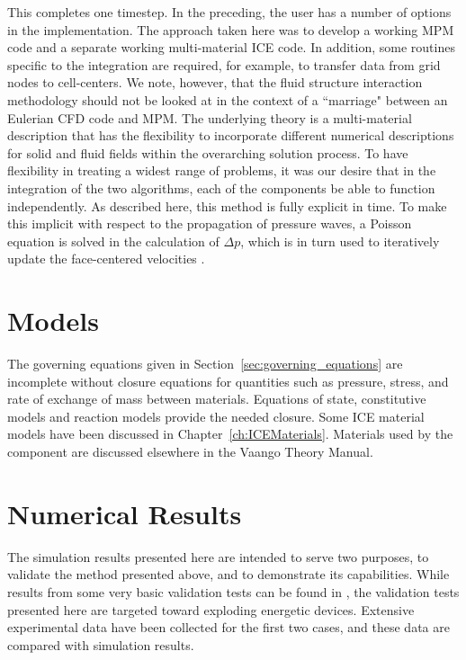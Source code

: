 This completes one timestep.  In the preceding, the user has a number of
options in the implementation.  The approach taken here was to develop a 
working MPM code and a separate working multi-material ICE code.  In 
addition, some routines specific to the integration are required, for 
example, to transfer data from grid nodes to cell-centers.  We 
note, however, that the fluid structure interaction methodology should 
not be looked at in the context of a ``marriage" between an Eulerian CFD 
code and MPM.  The underlying theory is a multi-material description
that has the flexibility to incorporate different numerical descriptions for 
solid and fluid fields within the overarching solution process. 
To have flexibility in treating a widest range of problems, it was our 
desire that in the integration of the two algorithms, each of the components 
be able to function independently.  As described here, this method is fully 
explicit in time.  To make this implicit with respect to the propagation 
of pressure waves, a Poisson equation is solved in the calculation of 
$\Delta p$, which is in turn used to iteratively update the face-centered 
velocities \cite{Kashiwa1994a}.

\section{Models}\label{sec:models}

The governing equations given in Section~\ref{sec:governing_equations} are 
incomplete without closure equations for quantities such as pressure, stress, 
and rate of exchange of mass between materials.  Equations of 
state, constitutive models and reaction models provide
the needed closure.  Some ICE material models have been discussed in
Chapter~\ref{ch:ICEMaterials}.  Materials used by the \MPM component are
discussed elsewhere in the Vaango Theory Manual.

\section{Numerical Results}\label{sec:numerical_results}

  The simulation results presented here are intended to serve two purposes, to 
  validate the method presented above, and to demonstrate its 
  capabilities.  While results from some very basic validation tests can be 
  found in \cite{fourthmit}, the validation tests presented here are 
  targeted toward exploding energetic devices.  Extensive experimental data have
  been collected for the first two cases, and these data are compared with 
  simulation results.  
  
